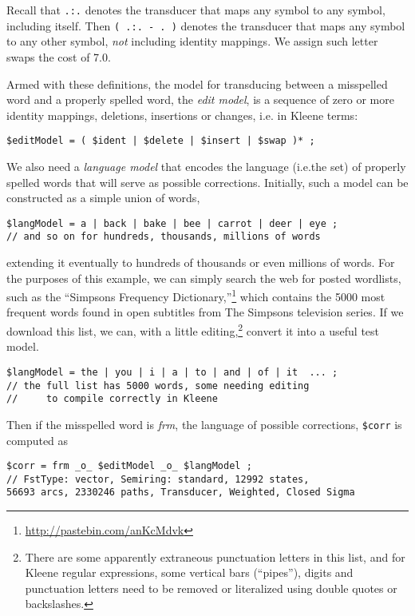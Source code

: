 \noindent
Recall that \texttt{.:.} denotes the transducer that maps any symbol to any
symbol, including itself.  Then \texttt{( .:. - . )} denotes the transducer
that maps any symbol to any other symbol, \emph{not} including identity mappings.  We
assign such letter swaps the cost of 7.0.

Armed with these definitions, the model for transducing between a 
misspelled word and a properly spelled word, the \emph{edit model}, is a
sequence of zero or more identity mappings, deletions, insertions or changes,
i.e. in Kleene terms:

\begin{Verbatim}
$editModel = ( $ident | $delete | $insert | $swap )* ;
\end{Verbatim}

We also need a \emph{language model} that encodes the language (i.e.\@ the
set) of properly spelled words that will serve as possible corrections.  
Initially, such a model can be constructed
as a simple union of words,

\begin{Verbatim}
$langModel = a | back | bake | bee | carrot | deer | eye ;
// and so on for hundreds, thousands, millions of words
\end{Verbatim}

\noindent
extending it eventually to hundreds of thousands or even millions of words.  For the purposes
of this example, we can simply search the web for posted wordlists, such as the
``Simpsons Frequency Dictionary,''\footnote{\url{http://pastebin.com/anKcMdvk}} which contains the 5000 most frequent words
found in open subtitles from The Simpsons television series.  If we download this list, we can, with a
little editing,\footnote{There are some apparently extraneous punctuation letters
	in this list, and for Kleene regular expressions, some vertical bars (``pipes''), digits and punctuation
letters need to be removed or literalized using double quotes or backslashes.} convert it into a useful test model.

\begin{Verbatim}
$langModel = the | you | i | a | to | and | of | it  ... ;
// the full list has 5000 words, some needing editing 
//     to compile correctly in Kleene
\end{Verbatim}

\noindent
Then if the misspelled word is \emph{frm}, the language of possible corrections,
\verb!$corr! is computed as

\begin{Verbatim}
$corr = frm _o_ $editModel _o_ $langModel ;
// FstType: vector, Semiring: standard, 12992 states,
56693 arcs, 2330246 paths, Transducer, Weighted, Closed Sigma
\end{Verbatim}

